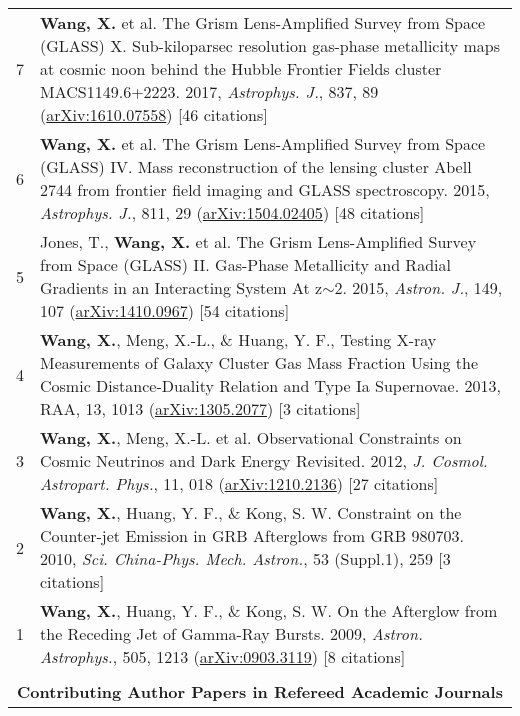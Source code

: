 \documentclass[letterpaper,10pt]{article}
\newcommand{\narrow}{-1.8ex}
\begin{document}
\begin{longtable}{rp{6.3in}}
7 &  \textbf{Wang, X.} et al. The Grism Lens-Amplified Survey from Space (GLASS) X. Sub-kiloparsec resolution gas-phase metallicity maps at cosmic noon behind the Hubble Frontier Fields cluster MACS1149.6+2223. 2017, \textit{Astrophys. J.}, 837, 89 (\href{http://arxiv.org/abs/1610.07558} {arXiv:1610.07558}) [46 citations]    \\

6 &  \textbf{Wang, X.} et al. The Grism Lens-Amplified Survey from Space (GLASS) IV. Mass reconstruction of the lensing cluster Abell 2744 from frontier field imaging and GLASS spectroscopy. 2015, \textit{Astrophys. J.}, 811, 29 (\href{http://arxiv.org/abs/1504.02405}{arXiv:1504.02405}) [48 citations] \\

5 &  Jones, T., \textbf{Wang, X.} et al. The Grism Lens-Amplified Survey from Space (GLASS) II. Gas-Phase Metallicity and Radial Gradients in an Interacting System At z$\sim$2. 2015, \textit{Astron. J.}, 149, 107 (\href{http://arxiv.org/abs/1410.0967}{arXiv:1410.0967}) [54 citations] \\

4 &  \textbf{Wang, X.}, Meng, X.-L., \& Huang, Y. F., Testing X-ray Measurements of Galaxy Cluster Gas Mass Fraction Using the Cosmic Distance-Duality Relation and Type Ia Supernovae. 2013, RAA, 13, 1013 (\href{http://arxiv.org/abs/1305.2077}{arXiv:1305.2077}) [3 citations] \\

3 &  \textbf{Wang, X.}, Meng, X.-L. et al. Observational Constraints on Cosmic Neutrinos and Dark Energy Revisited. 2012, \textit{J. Cosmol.  Astropart. Phys.}, 11, 018 (\href{http://arxiv.org/abs/1210.2136}{arXiv:1210.2136}) [27 citations] \\

2 &  \textbf{Wang, X.}, Huang, Y. F., \& Kong, S. W. Constraint on the Counter-jet Emission in GRB Afterglows from GRB 980703. 2010, \textit{Sci.  China-Phys. Mech. Astron.}, 53 (Suppl.1), 259 [3 citations]    \\

1 &  \textbf{Wang, X.}, Huang, Y. F., \& Kong, S. W. On the Afterglow from the Receding Jet of Gamma-Ray Bursts. 2009, \textit{Astron. Astrophys.}, 505, 1213 (\href{http://arxiv.org/abs/0903.3119}{arXiv:0903.3119}) [8 citations]   \\

\\[\narrow]
\multicolumn{2}{c}{\textbf{Contributing Author Papers in Refereed Academic Journals}}      \\


\end{longtable}
\end{document}
